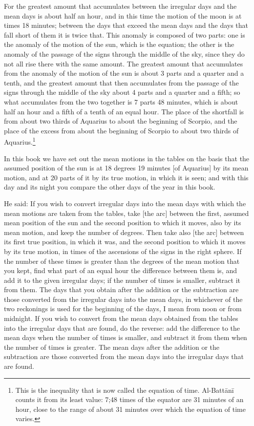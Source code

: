 \documentclass[11pt]{article}
\newcommand{\ArPage}[1]{\marginpar{\footnotesize\color{gray}Ar.\,p.\,#1}}
\begin{document}
\par For the greatest amount that accumulates between the irregular days and the mean days is about half an hour, and in this time the motion of the moon is at times 18 minutes; between the days that exceed the mean days and the days that fall short of them it is twice that. This anomaly is composed of two parts: one is the anomaly of the motion of the sun, which is the equation; the other is the anomaly of the passage of the signs through the middle of the sky, since they do not all rise there with the same amount. The greatest amount that accumulates from the anomaly of the motion of the sun is about 3 parts and a quarter and a tenth, and the greatest amount that then accumulates from the passage of the signs through the middle of the sky about 4 parts and a quarter and a fifth; so what accumulates from the two together is 7 parts 48 minutes, which is about half an hour and a fifth of a tenth of an equal hour. The place of the shortfall is from about two thirds of Aquarius to about the beginning of Scorpio, and the place of the excess from about the beginning of Scorpio to about two thirds of Aquarius.\footnote{This is the inequality that is now called the equation of time. Al-Battānī counts it from its least value: 7;48 times of the equator are 31 minutes of an hour, close to the range of about 31 minutes over which the equation of time varies.}\par
\par \ArPage{75}In this book we have set out the mean motions in the tables on the basis that the assumed position of the sun is at 18 degrees 19 minutes [of Aquarius] by its mean motion, and at 20 parts of it by its true motion, in which it is seen; and with this day and its night you compare the other days of the year in this book.\par
\par He said: If you wish to convert irregular days into the mean days with which the mean motions are taken from the tables, take [the arc] between the first, assumed mean position of the sun and the second position to which it moves, also by its mean motion, and keep the number of degrees. Then take also [the arc] between its first true position, in which it was, and the second position to which it moves by its true motion, in times of the ascensions of the signs in the right sphere. If the number of these times is greater than the degrees of the mean motion that you kept, find what part of an equal hour the difference between them is, and add it to the given irregular days; if the number of times is smaller, subtract it from them. The days that you obtain after the addition or the subtraction are those converted from the irregular days into the mean days, in whichever of the two reckonings is used for the beginning of the days, I mean from noon or from midnight. If you wish to convert from the mean days obtained from the tables into the irregular days that are found, do the reverse: add the difference to the mean days when the number of times is smaller, and subtract it from them when the number of times is greater. The mean days after the addition or the subtraction are those converted from the mean days into the irregular days that are found.\par
\end{document}
